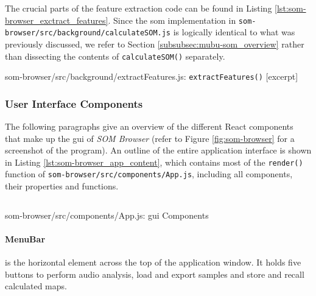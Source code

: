 \smallskip

The crucial parts of the feature extraction code can be found in Listing
\ref{lst:som-browser_exctract_features}. Since the \gls{som} implementation in
\texttt{som-browser/src/background/calculateSOM.js} is logically identical to
what was previously discussed, we refer to Section
\ref{subsubsec:mubu-som_overview} rather than dissecting the contents of
\texttt{calculateSOM()} separately.

\begin{listing}[!htb]
  \caption{som-browser/src/background/extractFeatures.js:
  \texttt{extractFeatures()} [excerpt]}
  \label{lst:som-browser_exctract_features}
\end{listing}

\subsubsection{User Interface Components}
\label{subsubsec:som-browser_components}
The following paragraphs give an overview of the different React components
that make up the \gls{gui} of \textit{SOM Browser} (refer to Figure
\ref{fig:som-browser} for a screenshot of the program). An outline of the entire
application interface is shown in Listing \ref{lst:som-browser_app_content},
which contains most of the \texttt{render()} function of
\texttt{som-browser/src/components/App.js}, including all components, their
properties and functions.

\begin{listing}[!htb]
  \begin{mdframed}
    \inputminted[numbers=left, firstline=405, lastline=459,
    fontsize=\scriptsize]{jsx}{../dev/som-browser/src/components/App.js}
  \end{mdframed}
  \caption{som-browser/src/components/App.js:
  \gls{gui} Components}
  \label{lst:som-browser_app_content}
\end{listing}


\paragraph*{MenuBar}
\label{para:menu_bar}
is the horizontal element across the top of the application window. It holds
five buttons to perform audio analysis, load and export samples and store and
recall calculated maps.

